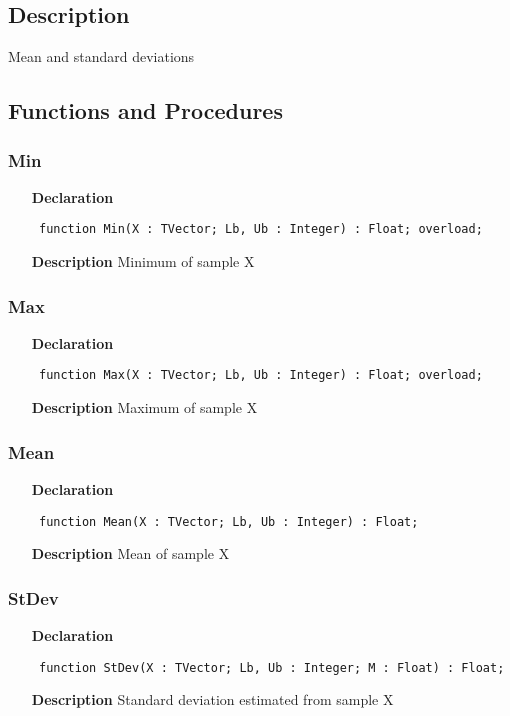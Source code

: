 \documentclass[12pt,a4paper,oneside]{report}
\newcommand{\declarationitem}[1]{\textbf{#1}}
\newcommand{\descriptiontitle}[1]{\textbf{#1}}
\newcommand{\code}[1]{\texttt{#1}}
\begin{document}
\subsection{Description}
Mean and standard deviations
\subsection{Functions and Procedures}
\subsubsection{Min}
\label{umeansd-Min}
\begin{itemize}\item[\declarationitem{Declaration}\hfill]
	\begin{flushleft}
		\code{
			function Min(X : TVector; Lb, Ub : Integer) : Float; overload;}
	\end{flushleft}
	\item[\descriptiontitle{Description}]
	Minimum of sample X
\end{itemize}
\subsubsection{Max}
\label{umeansd-Max}
\begin{itemize}\item[\declarationitem{Declaration}\hfill]
	\begin{flushleft}
		\code{
			function Max(X : TVector; Lb, Ub : Integer) : Float; overload;}
	\end{flushleft}
	\item[\descriptiontitle{Description}]
	Maximum of sample X
\end{itemize}
\subsubsection{Mean}
\label{umeansd-Mean}
\begin{itemize}\item[\declarationitem{Declaration}\hfill]
	\begin{flushleft}
		\code{
			function Mean(X : TVector; Lb, Ub : Integer) : Float;}
	\end{flushleft}
	\item[\descriptiontitle{Description}]
	Mean of sample X
\end{itemize}
\subsubsection{StDev}
\label{umeansd-StDev}
\begin{itemize}\item[\declarationitem{Declaration}\hfill]
	\begin{flushleft}
		\code{
			function StDev(X : TVector; Lb, Ub : Integer; M : Float) : Float;}
	\end{flushleft}
	\item[\descriptiontitle{Description}]
	Standard deviation estimated from sample X
\end{itemize}
\end{document}
